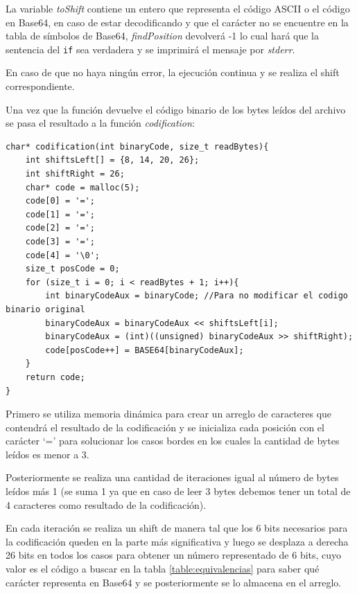 \documentclass[titlepage,a4paper]{article}
\begin{document}
La variable \textit{toShift} contiene un entero que representa el código ASCII o el código en Base64, en caso de estar decodificando y que el carácter no se encuentre en la tabla de símbolos de Base64, \textit{findPosition} devolverá -1 lo cual hará que la sentencia del \verb|if| sea verdadera y se imprimirá el mensaje por \textit{stderr}.\newline

En caso de que no haya ningún error, la ejecución continua y se realiza el shift correspondiente. \newline

Una vez que la función devuelve el código binario de los bytes leídos del archivo se pasa el resultado a la función \textit{codification}:

\begin{lstlisting}[style=customC]
char* codification(int binaryCode, size_t readBytes){
	int shiftsLeft[] = {8, 14, 20, 26};
	int shiftRight = 26;
	char* code = malloc(5);
	code[0] = '=';
	code[1] = '=';
	code[2] = '=';
	code[3] = '=';
	code[4] = '\0';
	size_t posCode = 0;
	for (size_t i = 0; i < readBytes + 1; i++){
		int binaryCodeAux = binaryCode; //Para no modificar el codigo binario original
		binaryCodeAux = binaryCodeAux << shiftsLeft[i];
		binaryCodeAux = (int)((unsigned) binaryCodeAux >> shiftRight);
		code[posCode++] = BASE64[binaryCodeAux];
	}
	return code;
}
\end{lstlisting}

Primero se utiliza memoria dinámica para crear un arreglo de caracteres que contendrá el resultado de la codificación y se inicializa cada posición con el carácter `=' para solucionar los casos bordes en los cuales la cantidad de bytes leídos es menor a 3. \newline

Posteriormente se realiza una cantidad de iteraciones igual al número de bytes leídos más 1 (se suma 1 ya que en caso de leer 3 bytes debemos tener un total de 4 caracteres como resultado de la codificación). \newline

En cada iteración se realiza un shift de manera tal que los 6 bits necesarios para la codificación queden en la parte más significativa y luego se desplaza a derecha 26 bits en todos los casos para obtener un número representado de 6 bits, cuyo valor es el código a buscar en la tabla \ref{table:equivalencias} para saber qué carácter representa en Base64 y se posteriormente se lo almacena en el arreglo. \newline
\end{document}
